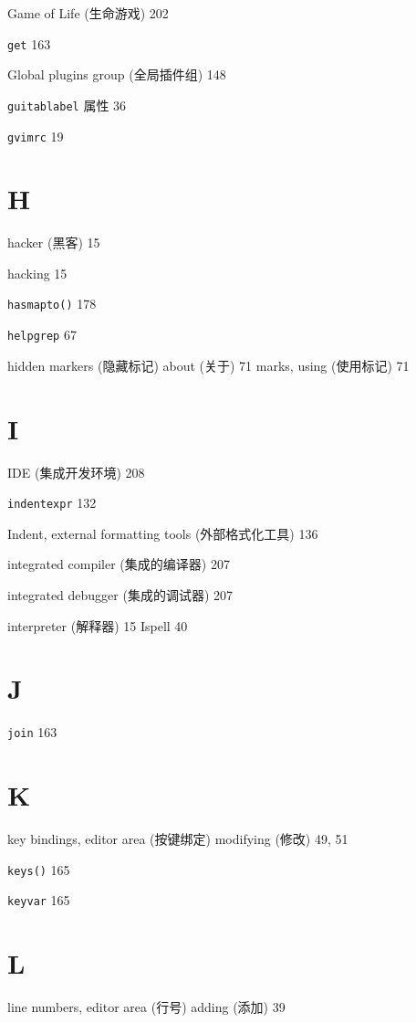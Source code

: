 Game of Life (生命游戏) 202

\texttt{get} 163

Global plugins group (全局插件组) 148

\texttt{guitablabel} 属性 36

\texttt{gvimrc} 19

\section{H}

hacker (黑客) 15

hacking 15

\texttt{hasmapto()} 178

\texttt{helpgrep} 67

hidden markers (隐藏标记)
  about (关于) 71
  marks, using (使用标记) 71

\section{I}

IDE (集成开发环境) 208

\texttt{indentexpr} 132

Indent, external formatting tools (外部格式化工具) 136

integrated compiler (集成的编译器) 207

integrated debugger (集成的调试器) 207

interpreter (解释器) 15
Ispell 40

\section{J}


\texttt{join} 163

\section{K}

key bindings, editor area (按键绑定)
  modifying (修改) 49, 51

\texttt{keys()} 165

\texttt{keyvar} 165

\section{L}

line numbers, editor area (行号)
  adding (添加) 39

